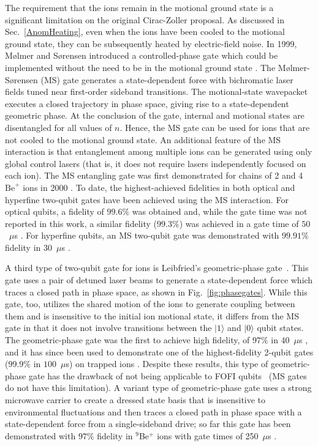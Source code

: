 \documentclass[%
12pt,
 amsmath,amssymb,
]{revtex4-2}
\newcommand{\zero}{|0 \rangle}
\newcommand{\one}{|1 \rangle}
\begin{document}
The requirement that the ions remain in the motional ground state is a significant limitation on the original Cirac-Zoller proposal. As discussed in Sec.~\ref{AnomHeating}, even when the ions have been cooled to the motional ground state, they can be subsequently heated by electric-field noise. In 1999, M{\o}lmer and S{\o}rensen introduced a controlled-phase gate which could be implemented without the need to be in the motional ground state \cite{MolmerSorensenGate}. The M{\o}lmer-S{\o}rensen (MS) gate generates a state-dependent force with bichromatic laser fields tuned near first-order sideband transitions. The motional-state wavepacket executes a closed trajectory in phase space, giving rise to a state-dependent geometric phase. At the conclusion of the gate, internal and motional states are disentangled for all values of $n$. Hence, the MS gate can be used for ions that are not cooled to the motional ground state. An additional feature of the MS interaction is that entanglement among multiple ions can be generated using only global control lasers (that is, it does not require lasers independently focused on each ion). The MS entangling gate was first demonstrated for chains of 2 and 4 $\mathrm{Be}^{+}$ ions in 2000 \cite{Sackett4IonEntanglement2000}. To date, the highest-achieved fidelities in both optical and hyperfine two-qubit gates have been achieved using the MS interaction. For optical qubits, a fidelity of $99.6 \%$ was obtained \cite{ErhardBlattCycleBench2019} and, while the gate time was not reported in this work, a similar fidelity ($99.3 \%$) was achieved in a gate time of $50$~$\mu$s \cite{BenhelmMSGate2008}.  For hyperfine qubits, an MS two-qubit gate was demonstrated with $99.91 \%$ fidelity in $30$~$\mu$s \cite{nist_gate_2016}.

A third type of two-qubit gate for ions is Leibfried's geometric-phase gate~\cite{LeibfriedDidiGate2003}. This gate uses a pair of detuned laser beams to generate a state-dependent force which traces a closed path in phase space, as shown in Fig.~\ref{fig:phasegates}. While this gate, too, utilizes the shared motion of the ions to generate coupling between them and is insensitive to the initial ion motional state, it differs from the MS gate in that it does not involve transitions between the $\one$ and $\zero$ qubit states. The geometric-phase gate was the first to achieve high fidelity, of $97 \%$ in $40$~$\mu$s \cite{LeibfriedDidiGate2003}, and it has since been used to demonstrate one of the highest-fidelity 2-qubit gates ($99.9 \%$ in $100$~$\mu$s) on trapped ions \cite{Ballance2QubitHyperfineGate2016}.  Despite these results, this type of geometric-phase gate has the drawback of not being applicable to FOFI qubits~\cite{LangerThesis2005} (MS gates do not have this limitation).  A variant type of geometric-phase gate \cite{BermudezGate2012} uses a strong microwave carrier to create a dressed state basis that is insensitive to environmental fluctuations and then traces a closed path in phase space with a state-dependent force from a single-sideband drive; so far this gate has been demonstrated with $97 \%$ fidelity in $^9$Be$^+$ ions with gate times of 250~$\mu$s \cite{TanDressedState2013}.
\end{document}
